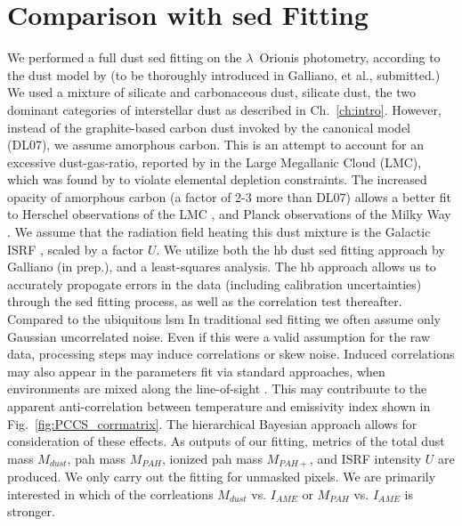         \section{Comparison with \acrshort{sed} Fitting}
          We performed a full dust \acrshort{sed} fitting on the $\lambda$~Orionis photometry, according to the dust model by \cite{galliano11} (to be thoroughly introduced in Galliano, et al., submitted.)  We used a mixture of silicate and carbonaceous dust, silicate dust, the two dominant categories of interstellar dust as described in Ch.~\ref{ch:intro}. However, instead of the graphite-based carbon dust invoked by the canonical \cite{draine07} model (DL07), we assume amorphous carbon. This is an attempt to account for an excessive dust-gas-ratio, reported by \cite{israel10, bot10} in the Large Megallanic Cloud (LMC), which was found by \cite{galliano11} to violate elemental depletion constraints. The increased opacity of amorphous carbon (a factor of 2-3 more than DL07) allows a better fit to Herschel observations of the LMC \citep{galliano11}, and Planck observations of the Milky Way \citep{planckIntXXIX16}. We assume that the radiation field heating this dust mixture is the Galactic ISRF \citep{mathis83}, scaled by a factor $U$.
          We utilize both the \acrlong{hb} dust \acrshort{sed} fitting approach by Galliano (in prep.), and a least-squares analysis. The \acrshort{hb} approach allows us to accurately propogate errors in the data (including calibration uncertainties) through the \acrshort{sed} fitting process, as well as the correlation test thereafter. Compared to the ubiquitous \acrlong{lsm} In traditional \acrshort{sed} fitting we often assume only Gaussian uncorrelated noise. Even if this were a valid assumption for the raw data, processing steps may induce correlations or skew noise. Induced correlations may also appear in the parameters fit via standard approaches, when environments are mixed along the line-of-sight \citep{shetty09}. This may contribuute to the apparent anti-correlation between temperature and emissivity index shown in Fig.~\ref{fig:PCCS_corrmatrix}. The hierarchical Bayesian approach allows for consideration of these effects. As outputs of our fitting, metrics of the total dust mass $M_{dust}$, \acrshort{pah} mass $M_{PAH}$, ionized \acrshort{pah} mass $M_{PAH+}$, and ISRF intensity $U$ are produced. We only carry out the fitting for unmasked pixels. We are primarily interested in which of the corrleations $M_{dust}$ vs. $I_{AME}$ or $M_{PAH}$ vs. $I_{AME}$ is stronger.
